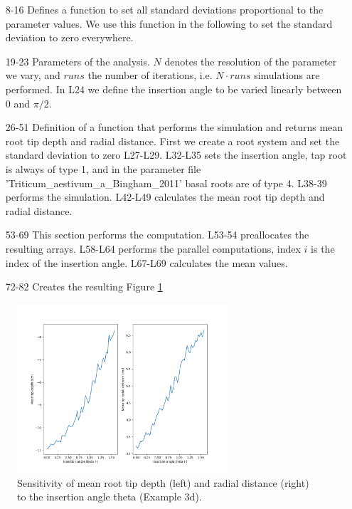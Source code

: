 \documentclass[a4paper]{article}
\begin{document}


\begin{itemize}

\item[8-16] Defines a function to set all standard deviations proportional to the parameter values. We use this function in the following to set the standard deviation to zero everywhere. 

\item[19-23] Parameters of the analysis. $N$ denotes the resolution of the parameter we vary, and $runs$ the number of iterations, i.e. $N\cdot runs$ simulations are performed. 
In L24 we define the insertion angle to be varied linearly between 0 and $\pi/2$.

\item[26-51] Definition of a function that performs the simulation and returns mean root tip depth and radial distance. First we create a root system and set the standard deviation to zero L27-L29. 
L32-L35 sets the insertion angle, tap root is always of type 1, and in the parameter file 'Triticum\_aestivum\_a\_Bingham\_2011' basal roots are of type 4. L38-39 performs the simulation. 
L42-L49 calculates the mean root tip depth and radial distance. 

\item[53-69] This section performs the computation. L53-54 preallocates the resulting arrays. L58-L64 performs the parallel computations, index $i$ is the index of the insertion angle. L67-L69 calculates the mean values.

\item[72-82] Creates the resulting Figure \ref{fig:sa}

\end{itemize}

\begin{figure}
\centering
\includegraphics[width=0.7\textwidth]{example_3d.png}
\caption{Sensitivity of mean root tip depth (left) and radial distance (right) to the insertion angle theta (Example 3d). } \label{fig:sa}
\end{figure}
\end{document}
